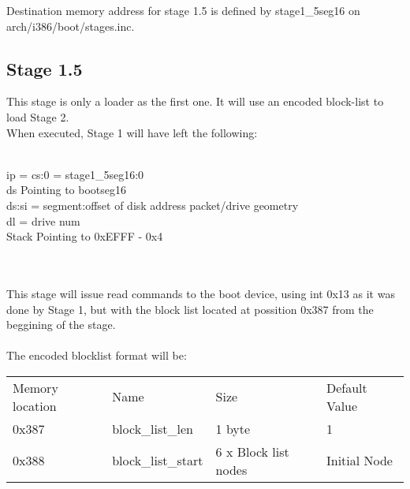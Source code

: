 \documentclass[11pt, letterpaper, twoside, english]{book}
\begin{document}
Destination memory address for stage 1.5 is defined by stage1\_5seg16 on arch/i386/boot/stages.inc. 

\subsection{Stage 1.5}

This stage is only a loader as the first one. It will use an encoded block-list to load Stage 2.\\

When executed, Stage 1 will have left the following:\\
\\
\begin{sf} 
\indent ip = cs:0 = stage1\_5seg16:0\\
\indent ds Pointing to bootseg16\\
\indent ds:si = segment:offset of disk address packet/drive geometry\\
\indent dl = drive num\\
\indent Stack Pointing to 0xEFFF - 0x4\\
\end{sf}\\
\\
This stage will issue read commands to the boot device, using int 0x13 as it was done by Stage 1, but with the block list located at possition 0x387 from the beggining of the stage.\\
\\
The encoded blocklist format will be:
\begin{center}
	\begin{tabular}{|l | l | l | l |}
	\hline
Memory location &	Name &	Size &	Default Value \\
0x387 &	block\_list\_len &	1 byte &	1 \\
0x388 &	block\_list\_start &	6 x Block list nodes &	Initial Node\\
\hline
	\end{tabular}
\end{center}
\end{document}
